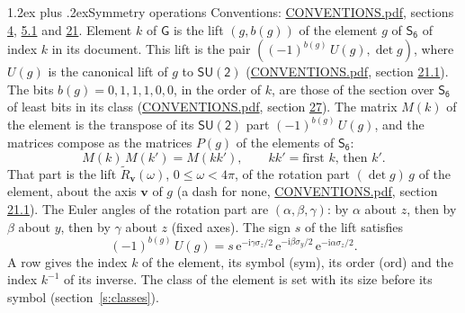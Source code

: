 \documentclass[10pt,a4paper]{article}
\makeatletter
\renewcommand\section{\@startsection{section}{1}{\z@}{-3ex plus -1ex minus -.2ex}%
  {1.2ex plus .2ex}{\normalfont\large\sffamily\bfseries\color{parttitle}}}
\numberwithin{equation}{section}
\newcommand{\grp}[1]{\mathsf{#1}}
\newcommand{\vv}{\mathbf{v}}
\newcommand{\iunit}{\mathrm{i}}
\newcommand{\expe}{\mathrm{e}}
\newcommand{\lift}[1]{\tilde{#1}}
\newcommand{\pauli}[1]{\sigma_{#1}}
\makeatother
\begin{document}
\section{Symmetry operations}\label{s:elements}
Conventions: \href{../../CONVENTIONS.pdf}{CONVENTIONS.pdf}, sections \href{../../../rotation/CONVENTIONS.pdf\#conv.4}{4}, \href{../../../rotation/CONVENTIONS.pdf\#conv.5.1}{5.1} and \href{../../CONVENTIONS.pdf\#conv.21}{21}.
\leavevmode\label{n:index.element}\label{n:element.g}\label{n:function.section}Element $k$ of $\grp{G}$ is the lift $(g, b(g))$ of the element $g$ of \href{../../../rotation/data/pdf/S6.pdf}{$\grp{S_{6}}$} of index $k$ in its document. This lift is the pair $((-1)^{b(g)}\,U(g), \det g)$, where $U(g)$ is the canonical lift of $g$ to $\grp{SU(2)}$ (\href{../../CONVENTIONS.pdf}{CONVENTIONS.pdf}, section \href{../../CONVENTIONS.pdf\#conv.21.1}{21.1}). The bits $b(g) = 0, 1, 1, 1, 0, 0$, in the order of $k$, are those of the section over $\grp{S_{6}}$ of least bits in its class (\href{../../CONVENTIONS.pdf}{CONVENTIONS.pdf}, section \href{../../CONVENTIONS.pdf\#conv.27}{27}). \label{n:matrix.element.pin}\label{n:matrix.element}The matrix $M(k)$ of the element is the transpose of its $\grp{SU(2)}$ part $(-1)^{b(g)}\,U(g)$, and the matrices compose as the matrices $P(g)$ of the elements of $\grp{S_{6}}$:
\begin{equation}\label{e:mprod}M(k)\,M(k') = M(kk'),\qquad kk' = \text{first } k\text{, then } k'.\end{equation}
\leavevmode\label{n:angle.omega}\label{n:vector.axis}\label{n:vector.pole}That part is the lift $\lift{R}_{\vv}(\omega)$, $0 \le \omega < 4\pi$, of the rotation part $(\det g)\,g$ of the element, about the axis $\vv$ of $g$ (a dash for none, \href{../../CONVENTIONS.pdf}{CONVENTIONS.pdf}, section \href{../../CONVENTIONS.pdf\#conv.21.1}{21.1}). \label{n:angle.euler.alpha}\label{n:angle.euler.beta}\label{n:angle.euler.gamma}\label{n:vector.coordinates}The Euler angles of the rotation part are $(\alpha,\beta,\gamma)$: by $\alpha$ about $z$, then by $\beta$ about $y$, then by $\gamma$ about $z$ (fixed axes). \label{n:local.euler.sign}The sign $s$ of the lift satisfies
\begin{equation}\label{e:euler}(-1)^{b(g)}\,U(g) = s\,\expe^{-\iunit\gamma\pauli{z}/2}\,\expe^{-\iunit\beta\pauli{y}/2}\,\expe^{-\iunit\alpha\pauli{z}/2}.\end{equation}
\leavevmode\label{n:index.element.inverse}\label{n:head.sym}\label{n:head.ord}A row gives the index $k$ of the element, its symbol (sym), its order (ord) and the index $k^{-1}$ of its inverse. \label{n:head.class}The class of the element is set with its size before its symbol (section~\ref{s:classes}).
\end{document}

